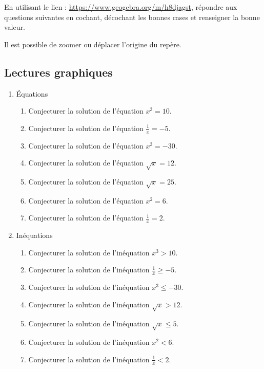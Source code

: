 \documentclass[10pt]{article}
\begin{document}
 


En utilisant le lien : \url{https://www.geogebra.org/m/h8djagst}, répondre aux questions suivantes en cochant, décochant les bonnes cases  et renseigner la bonne valeur. 

Il est possible de zoomer ou déplacer l'origine du repère.
 
\subsection*{Lectures graphiques} 

\begin{enumerate}
\item Équations
\begin{enumerate}
\item Conjecturer la solution de l'équation $x^3=10$. 
\item Conjecturer la solution de l'équation $\frac{1}{x}=-5$.  
\item Conjecturer la solution de l'équation $x^3=-30$.   
\item Conjecturer la solution de l'équation $\sqrt{x}=12$.   
\item Conjecturer la solution de l'équation $\sqrt{x}=25$.  
\item Conjecturer la solution de l'équation $x^2=6$. 
\item Conjecturer la solution de l'équation $\frac{1}{x}=2$.  
\end{enumerate}
\item Inéquations
\begin{enumerate}
\item Conjecturer la solution de l'inéquation $x^3>10$.  
\item Conjecturer la solution de l'inéquation $\frac{1}{x} \geq -5$.  
\item Conjecturer la solution de l'inéquation $x^3 \leq -30$.  
\item Conjecturer la solution de l'inéquation $\sqrt{x}>12$.   
\item Conjecturer la solution de l'inéquation $\sqrt{x}\leq 5$.  
\item Conjecturer la solution de l'inéquation $x^2<6$.  
\item Conjecturer la solution de l'inéquation $\frac{1}{x}<2$.   
\end{enumerate} 
\end{enumerate}
 
\end{document}
